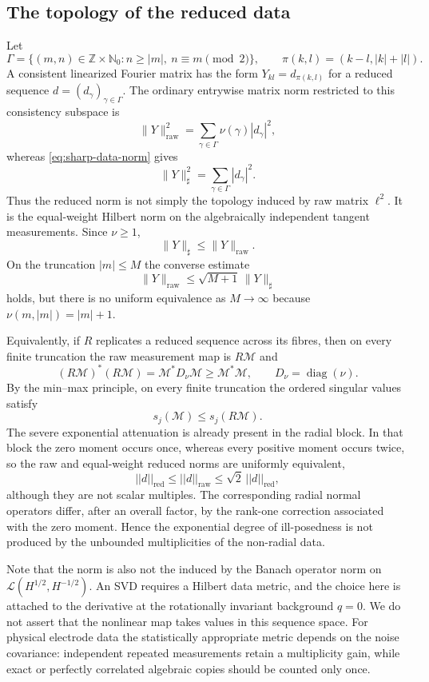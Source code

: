 \IfFileExists{iopjournal.cls}{\documentclass{iopjournal}}{\documentclass{iopjournal-draft}}
\theoremstyle{definition}
\theoremstyle{remark}
\newcommand{\norm}[1]{\lVert #1\rVert}
\newcommand{\N}{\mathbb N}
\newcommand{\Z}{\mathbb Z}
\numberwithin{equation}{section}
\begin{document}
\subsection{The topology of the reduced data}
Let
\[
 \Gamma=\{(m,n)\in\Z\times\N_0:n\geq |m|,\ n\equiv m\pmod 2\},
 \qquad \pi(k,l)=(k-l,|k|+|l|).
\]
A consistent linearized Fourier matrix has the form $Y_{kl}=d_{\pi(k,l)}$ for a reduced sequence $d=(d_\gamma)_{\gamma\in\Gamma}$.  The ordinary entrywise matrix norm restricted to this consistency subspace is
\begin{equation}
 \norm{Y}_{\mathrm{raw}}^2
 =\sum_{\gamma\in\Gamma}\nu(\gamma)|d_\gamma|^2,
 \label{eq:raw-data-norm}
\end{equation}
whereas \eqref{eq:sharp-data-norm} gives
\begin{equation}
 \norm{Y}_{\sharp}^2
 =\sum_{\gamma\in\Gamma}|d_\gamma|^2.
 \label{eq:reduced-data-norm}
\end{equation}
Thus the reduced norm is not simply the topology induced by raw matrix $\ell^2$.  It is the equal-weight Hilbert norm on the algebraically independent tangent measurements.  Since $\nu\geq1$,
\[
 \norm{Y}_{\sharp}\leq \norm{Y}_{\mathrm{raw}}.
\]
On the truncation $|m|\leq M$ the converse estimate
\[
 \norm{Y}_{\mathrm{raw}}\leq\sqrt{M+1}\,\norm{Y}_{\sharp}
\]
holds, but there is no uniform equivalence as $M\to\infty$ because $\nu(m,|m|)=|m|+1$.

Equivalently, if $R$ replicates a reduced sequence across its fibres, then on every finite truncation the raw measurement map is $R\mathcal M$ and
\[
 (R\mathcal M)^*(R\mathcal M)=\mathcal M^*D_\nu\mathcal M\geq\mathcal M^*\mathcal M,
 \qquad D_\nu=\operatorname{diag}(\nu).
\]
By the min--max principle, on every finite truncation the ordered singular values satisfy
\[
 s_j(\mathcal M)\leq s_j(R\mathcal M).
\]
The severe exponential attenuation is already present in the radial block. In that block the zero moment occurs once, whereas every positive moment occurs twice, so the raw and equal-weight reduced norms are uniformly equivalent,
\[||d||_{\mbox{red}} \leq ||d||_{\mbox{raw}} \leq \sqrt{2}\,||d||_{\mbox{red}},\]
although they are not scalar multiples. The corresponding radial normal operators differ, after an overall factor, by the rank-one correction associated with the zero moment. Hence the exponential degree of ill-posedness is not produced by the unbounded multiplicities of the non-radial data.

Note that the norm is also not the induced by the Banach operator norm on $\mathcal L(H^{1/2},H^{-1/2})$.  An SVD requires a Hilbert data metric, and the choice here is attached to the derivative at the rotationally invariant background $q=0$.  We do not assert that the nonlinear map takes values in this sequence space.  For physical electrode data the statistically appropriate metric depends on the noise covariance: independent repeated measurements retain a multiplicity gain, while exact or perfectly correlated algebraic copies should be counted only once.
\end{document}
